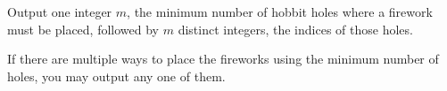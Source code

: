 
    Output one integer $m$, the minimum number of hobbit holes
    where a firework must be placed, followed by $m$ distinct
    integers, the indices of those holes.

    If there are multiple ways to place the fireworks using the minimum number of 
    holes, you may output any one of them.
